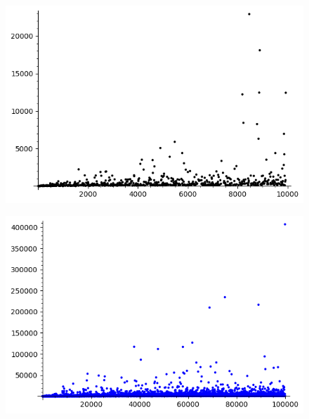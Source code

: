 \documentclass[12pt]{report}
\begin{document}
\begin{figure}[h]
\centering
\begin{minipage}{.5\textwidth}
  \centering
  \includegraphics[width=.9\linewidth]{MCount1.png}
  \label{LOL}
\end{minipage}%
\begin{minipage}{.5\textwidth}
  \centering
  \includegraphics[width=.9\linewidth]{MCount.png}
  \label{XD}
\end{minipage}
\end{figure}
\end{document}
